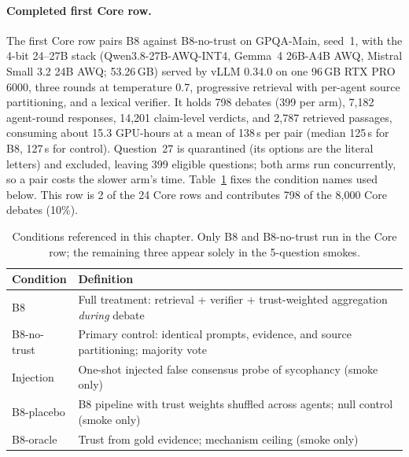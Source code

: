 \paragraph*{Completed first Core row.}
The first Core row pairs B8 against B8-no-trust on GPQA-Main, seed~1, with the 4-bit 24--27B stack (Qwen3.8-27B-AWQ-INT4, Gemma~4 26B-A4B AWQ, Mistral Small 3.2 24B AWQ; 53.26\,GB) served by vLLM 0.34.0 on one 96\,GB RTX PRO 6000, three rounds at temperature 0.7, progressive retrieval with per-agent source partitioning, and a lexical verifier. It holds 798 debates (399 per arm), 7{,}182 agent-round responses, 14{,}201 claim-level verdicts, and 2{,}787 retrieved passages, consuming about 15.3 GPU-hours at a mean of 138\,s per pair (median 125\,s for B8, 127\,s for control). Question~27 is quarantined (its options are the literal letters) and excluded, leaving 399 eligible questions; both arms run concurrently, so a pair costs the slower arm's time. Table~\ref{tab:core-conditions} fixes the condition names used below. This row is 2 of the 24 Core rows and contributes 798 of the 8{,}000 Core debates (10\%).

\begin{table}[H]
  \centering
  \caption{Conditions referenced in this chapter. Only B8 and B8-no-trust run in the Core row; the remaining three appear solely in the 5-question smokes.}
  \renewcommand{\arraystretch}{1.25}
  \small
  \begin{tabular}{|p{}|p{}|}
    \hline
    Condition & Definition \\
    \hline
    B8 & Full treatment: retrieval + verifier + trust-weighted aggregation \emph{during} debate \\
    \hline
    B8-no-trust & Primary control: identical prompts, evidence, and source partitioning; majority vote \\
    \hline
    Injection & One-shot injected false consensus probe of sycophancy (smoke only) \\
    \hline
    B8-placebo & B8 pipeline with trust weights shuffled across agents; null control (smoke only) \\
    \hline
    B8-oracle & Trust from gold evidence; mechanism ceiling (smoke only) \\
    \hline
  \end{tabular}
  \label{tab:core-conditions}
\end{table}

